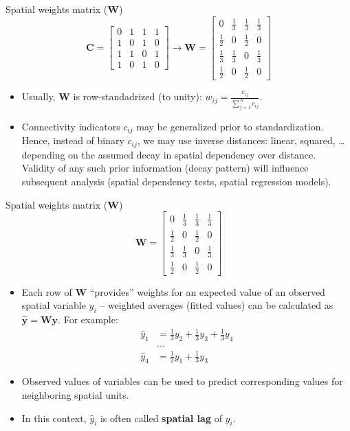 \documentclass{beamer}
\begin{document}
\begin{frame}{Spatial weights matrix ($\bm{W}$)}
\vspace{-0.5cm}
$$
\bm{C} = \begin{bmatrix}
0 & 1 & 1 & 1 \\
1 & 0 & 1 & 0 \\
1 & 1 & 0 & 1 \\
1 & 0 & 1 & 0
\end{bmatrix}\rightarrow 
\bm{W}=
\begin{bmatrix}
0 & \tfrac{1}{3} & \tfrac{1}{3} & \tfrac{1}{3} \\[2pt]
\tfrac{1}{2} & 0 & \tfrac{1}{2} & 0 \\[2pt]
\tfrac{1}{3} & \tfrac{1}{3} & 0 & \tfrac{1}{3} \\[2pt]
\tfrac{1}{2} & 0 & \tfrac{1}{2} & 0
\end{bmatrix}
$$
\begin{itemize}
	\item Usually, $\bm{W}$ is row-standadrized (to unity): 
	$w_{ij} = \frac{c_{ij}}{\sum^N_{j=1} c_{ij}}$.
	\smallskip
	\item Connectivity indicators $c_{ij}$ may be generalized prior to standardization. Hence, instead of binary $c_{ij}$, we may use inverse distances: linear, squared, \dots depending on the assumed decay in spatial dependency over distance. \\ \medskip Validity of any such prior information (decay pattern) will influence subsequent analysis (spatial dependency tests, spatial regression models).
\end{itemize}
\end{frame}
\begin{frame}{Spatial weights matrix ($\bm{W}$)}
\vspace{-0.2cm}
$$
\bm{W}=
\begin{bmatrix}
0 & \tfrac{1}{3} & \tfrac{1}{3} & \tfrac{1}{3} \\[2pt]
\tfrac{1}{2} & 0 & \tfrac{1}{2} & 0 \\[2pt]
\tfrac{1}{3} & \tfrac{1}{3} & 0 & \tfrac{1}{3} \\[2pt]
\tfrac{1}{2} & 0 & \tfrac{1}{2} & 0
\end{bmatrix}
$$
\begin{itemize}
	\item Each row of $\bm{W}$ ``provides'' weights for an expected value of an observed spatial variable $y_i$ -- weighted averages (fitted values) can be calculated as $\hat{\bm{y}} = \bm{W \! y}$. For example:
	\begin{align*}
	\hat{y}_1 & =  \tfrac{1}{3} y_2 + \tfrac{1}{3} y_3 + \tfrac{1}{3} y_4 \\
	&\dots \\
	\hat{y}_4 & = \tfrac{1}{2} y_1  + \tfrac{1}{3} y_3 
	\end{align*}
	\item Observed values of variables can be used to predict corresponding values for neighboring spatial units.
	\smallskip
	\item In this context, $\hat{y}_i$ is often called \textbf{spatial lag} of $y_i$.
\end{itemize}
\end{frame}
\end{document}
